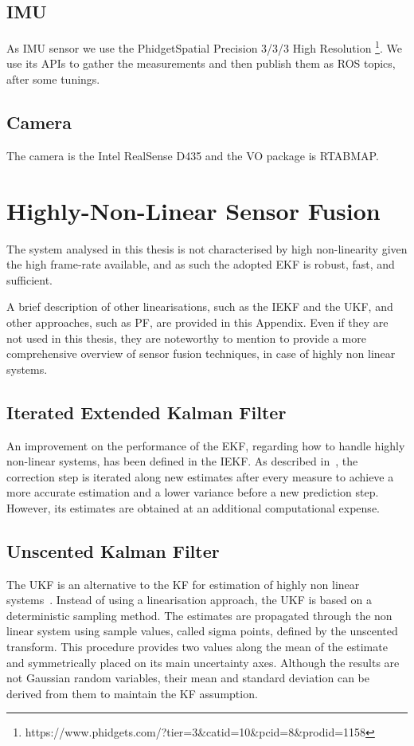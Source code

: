 {\section{IMU}

\noindent
As IMU sensor we use the PhidgetSpatial Precision 3/3/3 High Resolution \footnote{https://www.phidgets.com/?tier=3\&catid=10\&pcid=8\&prodid=1158}.
We use its APIs to gather the measurements and then publish them as ROS topics, after some tunings.

\section{Camera}

\noindent The camera is the Intel RealSense D435 and the \gls{VO} package is \gls{RTABMAP}.

}



\chapter{Highly-Non-Linear Sensor Fusion}
\label{ch:non-linear}
\noindent The system analysed in this thesis is not characterised by high non-linearity given the high frame-rate available, and as such the adopted \gls{EKF} is robust, fast, and sufficient.

A brief description of other linearisations, such as the \gls{IEKF} and the \gls{UKF}, and other approaches, such as \gls{PF}, are provided in this Appendix.
Even if they are not used in this thesis, they are noteworthy to mention to provide a more comprehensive overview of sensor fusion techniques, in case of highly non linear systems.


\section{Iterated Extended Kalman Filter}
\label{sec:iekf}
\noindent An improvement on the performance of the \gls{EKF}, regarding how to handle highly non-linear systems, has been defined in the \gls{IEKF}. As described in~\cite{xu_adaptive_2014}, the correction step is iterated along new estimates after every measure to achieve a more accurate estimation and a lower variance before a new prediction step.
However, its estimates are obtained at an additional computational expense.


\section{Unscented Kalman Filter}
\label{sec:ukf}
\noindent The \gls{UKF} is an alternative to the \gls{KF} for estimation of highly non linear systems~\cite{unscentedK}.
Instead of using a linearisation approach, the \gls{UKF} is based on a deterministic sampling method.
The estimates are propagated through the non linear system using sample values, called sigma points, defined by the unscented transform.
This procedure provides two values along the mean of the estimate and symmetrically placed on its main uncertainty axes.
Although the results are not Gaussian random variables, their mean and standard deviation can be derived from them to maintain the \gls{KF} assumption.

